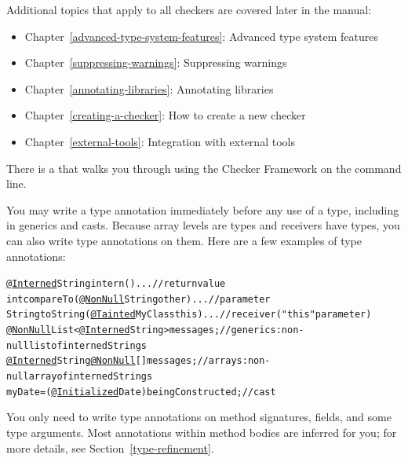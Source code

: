 Additional topics that apply to all checkers are covered later in the manual:
\begin{itemize}
\item Chapter~\ref{advanced-type-system-features}: Advanced type system features
\item Chapter~\ref{suppressing-warnings}: Suppressing warnings
\item Chapter~\ref{annotating-libraries}: Annotating libraries
\item Chapter~\ref{creating-a-checker}: How to create a new checker
\item Chapter~\ref{external-tools}: Integration with external tools
\end{itemize}


There is a
that walks you through using the Checker Framework on the
command line.




You may write a type annotation immediately before any
use of a type, including in generics and casts.  Because array levels are
types and receivers have types, you can also write type annotations on
them.  Here are a few examples of type annotations:

\begin{smaller}
\begin{alltt}
  \underline{@Interned} String intern() \ttlcb{} ... \ttrcb{}               // return value
  int compareTo(\underline{@NonNull} String other) \ttlcb{} ... \ttrcb{}    // parameter
  String toString(\underline{@Tainted} MyClass this) \ttlcb{} ... \ttrcb{}  // receiver ("this" parameter)
  \underline{@NonNull} List<\underline{@Interned} String> messages;       // generics:  non-null list of interned Strings
  \underline{@Interned} String \underline{@NonNull} [] messages;          // arrays:  non-null array of interned Strings
  myDate = (\underline{@Initialized} Date) beingConstructed;  // cast
\end{alltt}
\end{smaller}

You only need to write type annotations on method signatures, fields, and some type arguments.
Most annotations within method bodies are inferred for you; for more details,
see Section~\ref{type-refinement}.

